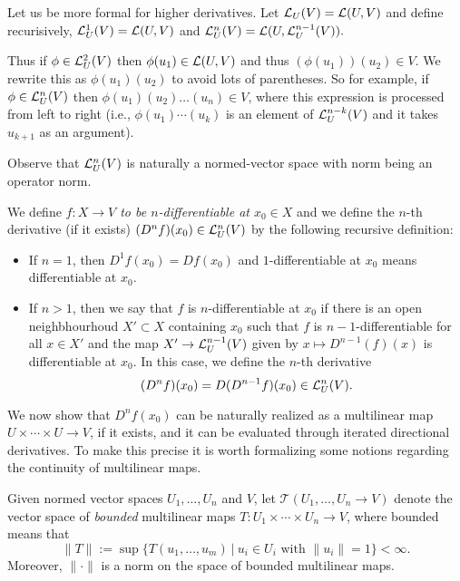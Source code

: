 \documentclass[twoside, a4paper, 10pt]{amsart}
\begin{document}
Let us be more formal for higher derivatives. Let $\mathcal{L}_{U}(V) = \mathcal{L}(U,V)$ and define recurisively, $\mathcal{L}^1_{U}(V) = \mathcal{L}(U,V)$ and $\mathcal{L}^n_{U}(V) = \mathcal{L}(U, \mathcal{L}^{n-1}_{U}(V)).$ 

Thus if $\phi \in \mathcal{L}^2_{U}(V)$ then $\phi(u_1) \in \mathcal{L}(U,V)$ and thus $(\phi(u_1))(u_2) \in V$. We rewrite this as $\phi(u_1)(u_2)$ to avoid lots of parentheses. So for example, if $\phi \in \mathcal{L}^n_U(V)$ then $\phi(u_1)(u_2) \dots (u_n) \in V$, where this expression is processed from left to right (i.e., $\phi(u_1) \cdots (u_k)$ is an element of $\mathcal{L}^{n-k}_U(V)$ and it takes $u_{k+1}$ as an argument).

Observe that $\mathcal{L}^n_U(V)$ is naturally a normed-vector space with norm being an operator norm.

\begin{mydef} We define \textit{$f:X \to V$ to be $n$-differentiable at $x_0 \in X$} and we define the $n$-th derivative (if it exists) $(D^nf)(x_0) \in \mathcal{L}^n_U(V)$ by the following recursive definition:

\begin{itemize} 
	\item If $n=1$, then $D^1f(x_0) = Df(x_0)$ and $1$-differentiable at $x_0$ means differentiable at $x_0$.
	\item If $n>1$, then we say that $f$ is $n$-differentiable at $x_0$ if there is an open neighbhourhoud $X' \subset X$ containing $x_0$ such that $f$ is $n-1$-differentiable for all $x \in X'$ and the map $X' \to \mathcal{L}_{U}^{n-1}(V)$ given by $x \mapsto D^{n-1}(f)(x)$ is differentiable at $x_0$. In this case, we define the $n$-th derivative 
$$(D^{n}f) (x_0) = D(D^{n-1}f)(x_0) \in \mathcal{L}^{n}_U(V).$$

\end{itemize}

\end{mydef}

We now show that $D^n f(x_0)$ can be naturally realized as a multilinear map $U \times \cdots \times U \to V$, if it exists, and it can be evaluated through iterated directional derivatives. To make this precise it is worth formalizing some notions regarding the continuity of multilinear maps.

\begin{mydef} Given normed vector spaces $U_1, \ldots, U_n$ and $V$, let $\mathcal{T}(U_1, \ldots, U_n \to V)$ denote the vector space of \textit{bounded} multilinear maps $T: U_1 \times \cdots \times U_n \to V$, where bounded means that $$\| T \| := \sup \{ T(u_1, \ldots, u_m) ~|~ u_i \in U_i \text{ with } \|u_i \| = 1 \} < \infty.$$ Moreover, $\| \cdot \|$ is a norm on the space of bounded multilinear maps.  \end{mydef}
\end{document}
